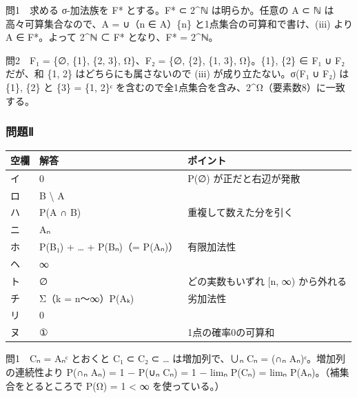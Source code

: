 \documentclass[
  10pt,
  a4paper,
]{article}
\begin{document}
問1　求める σ-加法族を F* とする。F* ⊂ 2\^{}{\fallbackfont ℕ}
は明らか。任意の A ⊂ {\fallbackfont ℕ} は高々可算集合なので、A = ∪（n ∈
A）\{n\} と1点集合の可算和で書け、(iii) より A ∈ F*。よって
2\^{}{\fallbackfont ℕ} ⊂ F* となり、F* = 2\^{}{\fallbackfont ℕ}。

問2　F{\fallbackfont ₁} = \{∅, \{1\}, \{2, 3\}, Ω\}、F{\fallbackfont ₂}
= \{∅, \{2\}, \{1, 3\}, Ω\}。\{1\}, \{2\} ∈ F{\fallbackfont ₁} ∪
F{\fallbackfont ₂} だが、和 \{1, 2\} はどちらにも属さないので (iii)
が成り立たない。σ(F{\fallbackfont ₁} ∪ F{\fallbackfont ₂}) は \{1\},
\{2\} と \{3\} = \{1, 2\}{\fallbackfont ᶜ}
を含むので全1点集合を含み、2\^{}Ω（要素数8）に一致する。

\hypertarget{ux554fux984cux2171}{%
\subsubsection{問題Ⅱ}\label{ux554fux984cux2171}}

\begin{longtable}[]{@{}lll@{}}
\toprule\noalign{}
空欄 & 解答 & ポイント \\
\midrule\noalign{}
\endhead
\bottomrule\noalign{}
\endlastfoot
イ & 0 & P(∅) が正だと右辺が発散 \\
ロ & B \textbackslash{} A & \\
ハ & P(A ∩ B) & 重複して数えた分を引く \\
ニ & A{\fallbackfont ₙ} & \\
ホ & P(B{\fallbackfont ₁}) + \ldots{} + P(B{\fallbackfont ₙ})（=
P(A{\fallbackfont ₙ})） & 有限加法性 \\
ヘ & ∞ & \\
ト & ∅ & どの実数もいずれ {[}n, ∞) から外れる \\
チ & Σ（k = n〜∞）P(A{\fallbackfont ₖ}) & 劣加法性 \\
リ & 0 & \\
ヌ & ① & 1点の確率0の可算和 \\
\end{longtable}

問1　C{\fallbackfont ₙ} = A{\fallbackfont ₙᶜ} とおくと
C{\fallbackfont ₁} ⊂ C{\fallbackfont ₂} ⊂ \ldots{}
は増加列で、∪{\fallbackfont ₙ} C{\fallbackfont ₙ} = (∩{\fallbackfont ₙ}
A{\fallbackfont ₙ}){\fallbackfont ᶜ}。増加列の連続性より
P(∩{\fallbackfont ₙ} A{\fallbackfont ₙ}) = 1 − P(∪{\fallbackfont ₙ}
C{\fallbackfont ₙ}) = 1 − lim{\fallbackfont ₙ} P(C{\fallbackfont ₙ}) =
lim{\fallbackfont ₙ} P(A{\fallbackfont ₙ})。（補集合をとるところで P(Ω)
= 1 \textless{} ∞ を使っている。）
\end{document}
